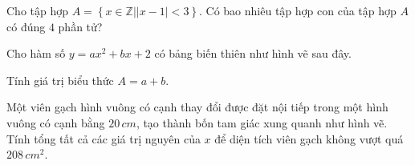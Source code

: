 \TNSA
\begin{ex}
 Cho tập hợp $A=\left\{ x\in \mathbb{Z}\left| |x-1|<3 \right. \right\}$. Có bao nhiêu tập hợp con của tập hợp $A$ có đúng $4$ phần tử?
\loigiai{ }
\end{ex}
\begin{ex}
Cho hàm số $y=ax^2+bx+2$ có bảng biến thiên như hình vẽ sau đây.
\begin{center}
\end{center}
Tính giá trị biểu thức $A=a+b$.
\loigiai{ }
\end{ex}\newpage
\begin{ex}
 Một viên gạch hình vuông có cạnh thay đổi được đặt nội tiếp trong một hình vuông có cạnh bằng $20\,cm$, tạo thành bốn tam giác xung quanh như hình vẽ. Tính tổng tất cả các giá trị nguyên của $x$ để diện tích viên gạch không vượt quá $208\,cm^2$.
\begin{center}
\end{center}
\loigiai{ }
\end{ex}\newpage
